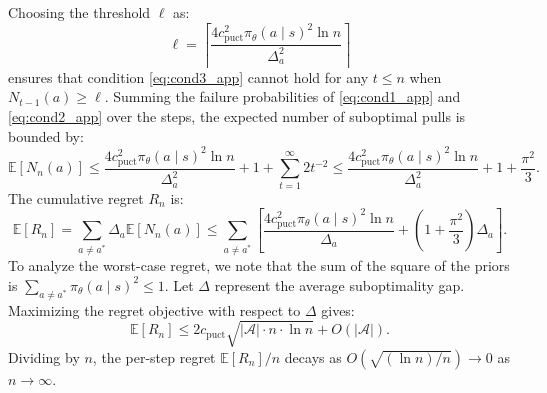 \documentclass{article}
\begin{document}
Choosing the threshold $\ell$ as:
\begin{equation}
    \ell = \left\lceil \frac{4 c_{\mathrm{puct}}^2 \pi_\theta(a \mid s)^2 \ln n}{\Delta_a^2} \right\rceil
\end{equation}
ensures that condition \eqref{eq:cond3_app} cannot hold for any $t \leq n$ when $N_{t-1}(a) \geq \ell$.
Summing the failure probabilities of \eqref{eq:cond1_app} and \eqref{eq:cond2_app} over the steps, the expected number of suboptimal pulls is bounded by:
\begin{equation}
    \mathbb{E}[N_n(a)] \leq \frac{4 c_{\mathrm{puct}}^2 \pi_\theta(a \mid s)^2 \ln n}{\Delta_a^2} + 1 + \sum_{t=1}^{\infty} 2 t^{-2} \leq \frac{4 c_{\mathrm{puct}}^2 \pi_\theta(a \mid s)^2 \ln n}{\Delta_a^2} + 1 + \frac{\pi^2}{3}.
\end{equation}
The cumulative regret $R_n$ is:
\begin{equation}
    \mathbb{E}[R_n] = \sum_{a \neq a^*} \Delta_a \mathbb{E}[N_n(a)] \leq \sum_{a \neq a^*} \left[ \frac{4 c_{\mathrm{puct}}^2 \pi_\theta(a \mid s)^2 \ln n}{\Delta_a} + \left(1 + \frac{\pi^2}{3}\right) \Delta_a \right].
\end{equation}
To analyze the worst-case regret, we note that the sum of the square of the priors is $\sum_{a \neq a^*} \pi_\theta(a \mid s)^2 \leq 1$. Let $\Delta$ represent the average suboptimality gap. Maximizing the regret objective with respect to $\Delta$ gives:
\begin{equation}
    \mathbb{E}[R_n] \leq 2 c_{\mathrm{puct}} \sqrt{|\mathcal{A}| \cdot n \cdot \ln n} + O(|\mathcal{A}|).
\end{equation}
Dividing by $n$, the per-step regret $\mathbb{E}[R_n]/n$ decays as $O(\sqrt{(\ln n)/n}) \to 0$ as $n \to \infty$.
\end{document}
